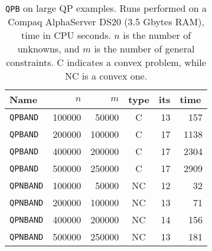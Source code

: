 \documentclass[twoside]{article}
\begin{document}
\begin{table}[ht]
\begin{center}
\begin{tabular}[c]{|lrrc|rr|}
\hline
Name      & $n$ & $m$ & type & its & time\, \\
\hline
{\tt QPBAND}  & 100000 & 50000  & C &   13  & {157} \\
{\tt QPBAND}  & 200000 & 100000 & C &   17  & {1138} \\
{\tt QPBAND}  & 400000 & 200000 & C &   17  & {2304} \\
{\tt QPBAND}  & 500000 & 250000 & C &   17  & {2909} \\
\hline
{\tt QPNBAND}  & 100000 & 50000  & NC &   12  & {32} \\
{\tt QPNBAND}  & 200000 & 100000 & NC &   13  & {71} \\
{\tt QPNBAND}  & 400000 & 200000 & NC &   14  & {156} \\
{\tt QPNBAND}  & 500000 & 250000 & NC &   13  & {181} \\
\hline
\end{tabular}
\end{center}
\caption{\label{figa} {\tt QPB} on large QP examples.
Runs performed on a Compaq AlphaServer DS20 (3.5 Gbytes RAM),
time in CPU seconds. $n$ is the number of unknowns, and
$m$ is the number of general constraints.
C indicates a convex problem, while NC is a convex one.}
\end{table}
\end{document}
